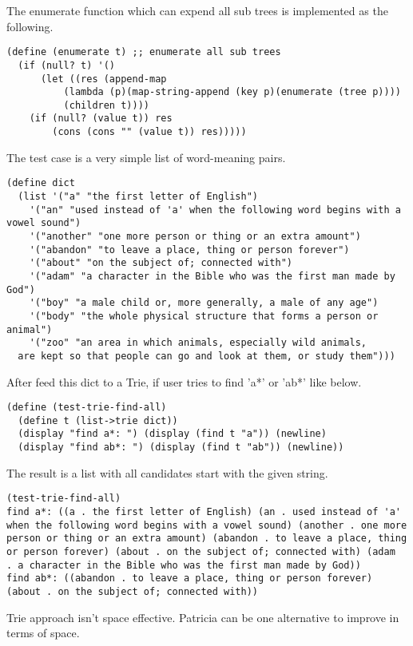 \documentclass{article}
\begin{document}
The enumerate function which can expend all sub trees is implemented
as the following.

\begin{lstlisting}
(define (enumerate t) ;; enumerate all sub trees
  (if (null? t) '()
      (let ((res (append-map
		  (lambda (p)(map-string-append (key p)(enumerate (tree p))))
		  (children t))))
	(if (null? (value t)) res
	    (cons (cons "" (value t)) res)))))
\end{lstlisting}

The test case is a very simple list of word-meaning pairs.

\begin{lstlisting}
(define dict
  (list '("a" "the first letter of English")
	'("an" "used instead of 'a' when the following word begins with a vowel sound")
	'("another" "one more person or thing or an extra amount")
	'("abandon" "to leave a place, thing or person forever")
	'("about" "on the subject of; connected with")
	'("adam" "a character in the Bible who was the first man made by God")
	'("boy" "a male child or, more generally, a male of any age")
	'("body" "the whole physical structure that forms a person or animal")
	'("zoo" "an area in which animals, especially wild animals,
  are kept so that people can go and look at them, or study them")))
\end{lstlisting}

After feed this dict to a Trie, if user tries to find 'a*' or 'ab*'
like below.

\begin{lstlisting}
(define (test-trie-find-all)
  (define t (list->trie dict))
  (display "find a*: ") (display (find t "a")) (newline)
  (display "find ab*: ") (display (find t "ab")) (newline))
\end{lstlisting}

The result is a list with all candidates start with the given string.
\begin{verbatim}
(test-trie-find-all)
find a*: ((a . the first letter of English) (an . used instead of 'a'
when the following word begins with a vowel sound) (another . one more
person or thing or an extra amount) (abandon . to leave a place, thing
or person forever) (about . on the subject of; connected with) (adam
. a character in the Bible who was the first man made by God))
find ab*: ((abandon . to leave a place, thing or person forever)
(about . on the subject of; connected with))
\end{verbatim}

Trie approach isn't space effective. Patricia can be one alternative
to improve in terms of space.
\end{document}
